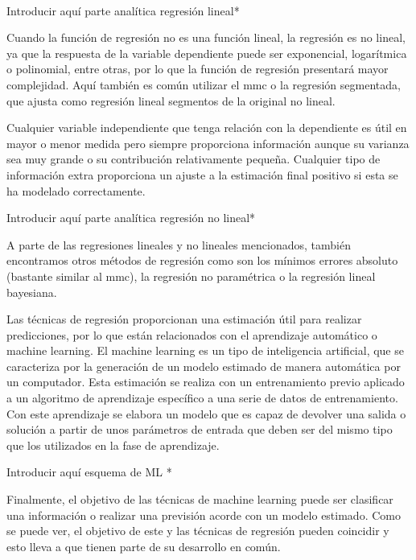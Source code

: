 \\
\par *Introducir aquí parte analítica regresión lineal*
\\ 
\par Cuando la función de regresión no es una función lineal, la regresión es no lineal, ya que la respuesta de la variable dependiente puede ser exponencial, logarítmica o polinomial, entre otras, por lo que la función de regresión presentará mayor complejidad. Aquí también es común utilizar el \gls{mmc} o la regresión segmentada, que ajusta como regresión lineal segmentos de la original no lineal.
\\
\par Cualquier variable independiente que tenga relación con la dependiente es útil en mayor o menor medida pero siempre proporciona información aunque su varianza sea muy grande o su contribución relativamente pequeña. Cualquier tipo de información extra proporciona un ajuste a la estimación final positivo si esta se ha modelado correctamente. 
\\
\par *Introducir aquí parte analítica regresión no lineal*
\\
\par A parte de las regresiones lineales y no lineales mencionados, también encontramos otros métodos de regresión como son los mínimos errores absoluto (bastante similar al \gls{mmc}), la regresión no paramétrica o la regresión lineal bayesiana.

\par Las técnicas de regresión proporcionan una estimación útil para realizar predicciones, por lo que están relacionados con el aprendizaje automático o machine learning. El machine learning es un tipo de inteligencia artificial, que se caracteriza por la generación de un modelo estimado de manera automática por un computador. Esta estimación se realiza con un entrenamiento previo aplicado a un algoritmo de aprendizaje específico a una serie de datos de entrenamiento. Con este aprendizaje se elabora un modelo que es capaz de devolver una salida o solución a partir de unos parámetros de entrada que deben ser del mismo tipo que los utilizados en la fase de aprendizaje. 
\\
\par * Introducir aquí esquema de ML *
\\
\par Finalmente, el objetivo de las técnicas de machine learning puede ser clasificar una información o realizar una previsión acorde con un modelo estimado. Como se puede ver, el objetivo de este y las técnicas de regresión pueden coincidir y esto lleva a que tienen parte de su desarrollo en común. 

